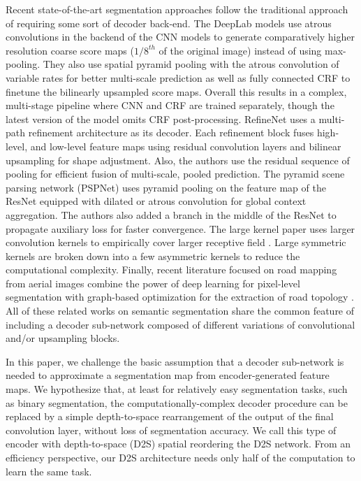 \documentclass[10pt,twocolumn,letterpaper]{article}
\begin{document}
Recent state-of-the-art segmentation approaches follow the traditional approach of requiring some sort of decoder back-end.
%
The DeepLab models \cite{deeplab-v1, deeplab-v2} use atrous convolutions \cite{atrous} in the backend of the CNN models to generate comparatively higher resolution coarse score maps ($1/8^{th}$ of the original image) instead of using max-pooling. They also use spatial pyramid pooling \cite{sppnet} with the atrous convolution of variable rates for better multi-scale prediction as well as fully connected CRF \cite{fc-crf} to finetune the bilinearly upsampled score maps.
Overall this results in a complex, multi-stage pipeline where CNN and CRF are trained separately, though the latest version of the model\cite{deeplab-v3} omits CRF post-processing.
%
RefineNet \cite{refinenet} uses a multi-path refinement architecture as its decoder. Each refinement block fuses high-level, and low-level feature maps using residual convolution layers and bilinear upsampling for shape adjustment. Also, the authors use the residual sequence of pooling for efficient fusion of multi-scale, pooled prediction.
%
The pyramid scene parsing network (PSPNet) \cite{pspnet} uses pyramid pooling on the feature map of the ResNet equipped with dilated or atrous convolution for global context aggregation. The authors also added a branch in the middle of the ResNet to propagate auxiliary loss for faster convergence.
%
The large kernel paper \cite{large-kernel-matters} uses larger convolution kernels to empirically cover larger receptive field \cite{zhou-detectors}. Large symmetric kernels are broken down into a few asymmetric kernels to reduce the computational complexity.
%
Finally, recent literature focused on road mapping from aerial images combine the power of deep learning for pixel-level segmentation with graph-based optimization for the extraction of road topology \cite{deep-road-mapper,roadmap-gan}.
%
All of these related works on semantic segmentation share the common feature of including a decoder sub-network composed of different variations of convolutional and/or upsampling blocks.

In this paper, we challenge the basic assumption that a decoder sub-network is needed to approximate a segmentation map from encoder-generated feature maps. We hypothesize that, at least for relatively easy segmentation tasks, such as binary segmentation, the computationally-complex decoder procedure can be replaced by a simple depth-to-space rearrangement of the output of the final convolution layer, without loss of segmentation accuracy. We call this type of encoder with depth-to-space (D2S) spatial reordering the D2S network. From an efficiency perspective, our D2S architecture needs only half of the computation to learn the same task.
\end{document}
